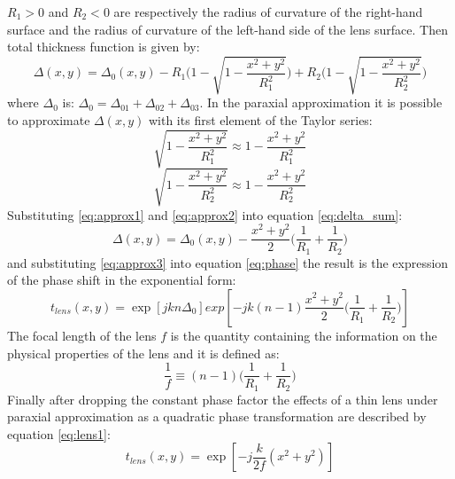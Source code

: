 \begin{math}
	R_1>0
\end{math}
and
\begin{math}
	R_2<0
\end{math}
are respectively the radius of curvature of the right-hand surface and the radius of curvature of the left-hand side of the lens surface.
Then total thickness function is given by:
\begin{equation}
\label{eq:delta_sum}
	\Delta(x,y)=\Delta_0(x,y)-R_1\bigg(1-\sqrt{1-\frac{x^2+y^2}{R_1^2}})+R_2(1-\sqrt{1-\frac{x^2+y^2}{R_2^2}}\bigg)
\end{equation}
where $\Delta_0$ is:
\begin{math}
	\Delta_0=\Delta_{01}+\Delta_{02}+\Delta_{03}
\end{math}.
In the paraxial approximation it is possible to approximate $\Delta(x,y)$ with its first element of the Taylor series:
\begin{equation}
\label{eq:approx1}
\sqrt{1-\frac{x^2+y^2}{R_1^2}}\approx 1-\frac{x^2+y^2}{R_1^2}
\end{equation}
\begin{equation}
\label{eq:approx2}
\sqrt{1-\frac{x^2+y^2}{R_2^2}}\approx 1-\frac{x^2+y^2}{R_2^2}
\end{equation}
 Substituting \ref{eq:approx1} and \ref{eq:approx2} into equation \ref{eq:delta_sum}:
 \begin{equation}
 \label{eq:approx3}
 \Delta(x,y)=\Delta_0(x,y)-\frac{x^2+y^2}{2}\bigg(\frac{1}{R_1}+\frac{1}{R_2}\bigg)
 \end{equation}
and substituting \ref{eq:approx3} into equation \ref{eq:phase} the result is the expression of the phase shift in the exponential form:
 \begin{equation}
 \label{eq:expon}
 t_{lens}(x,y)=\exp[jkn\Delta_0]exp[-jk(n-1)\frac{x^2+y^2}{2} \bigg(\frac{1}{R_1}+\frac{1}{R_2}\bigg)]
 \end{equation}
 The focal length of the lens $f$ is the quantity containing the information on the physical properties of the lens and it is defined as:
	\begin{equation}
 \label{eq:focal}
 \frac{1}{f} \equiv(n-1) \bigg(\frac{1}{R_1}+\frac{1}{R_2}\bigg)
	\end{equation}
 Finally after dropping the constant phase factor the effects of a thin lens under paraxial approximation as a quadratic phase transformation are described by equation \ref{eq:lens1}:
 \begin{equation}
 	\label{eq:lens1}
 	t_{lens}(x,y)=\exp[-j\frac{k}{2f}(x^2+y^2)]
 \end{equation}
